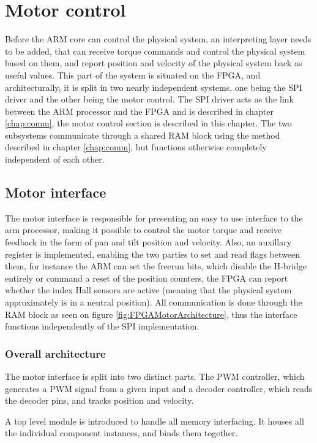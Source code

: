 \chapter{Motor control}\label{chap:llc}
Before the ARM core can control the physical system, an interpreting layer needs to be added, that can receive torque commands and control the physical system based on them, and report position and velocity of the physical system back as useful values.
This part of the system is situated on the FPGA, and architecturally, it is split in two nearly independent systems, one being the SPI driver and the other being the motor control.
The SPI driver acts as the link between the ARM processor and the FPGA and is described in chapter \ref{chap:comm}, the motor control section is described in this chapter.
The two subsystems communicate through a shared RAM block using the method described in chapter \ref{chap:comm}, but functions otherwise completely independent of each other.


\section{Motor interface}
The motor interface is responsible for presenting an easy to use interface to the arm processor, making it possible to control the motor torque and receive feedback in the form of pan and tilt position and velocity.
Also, an auxillary register is implemented, enabling the two parties to set and read flags between them, for instance the ARM can set the freerun bits, which disable the H-bridge entirely or command a reset of the position counters, the FPGA can report whether the index Hall sensors are active (meaning that the physical system approximately is in a neutral position).
All communication is done through the RAM block as seen on figure \ref{fig:FPGAMotorArchitecture}, thus the interface functions independently of the SPI implementation.

\subsection{Overall architecture}
The motor interface is split into two distinct parts. The PWM controller, which generates a PWM signal from a given input and a decoder controller, which reads the decoder pins, and tracks position and velocity.

A top level module is introduced to handle all memory interfacing. It houses all the individual component instances, and binds them together.

